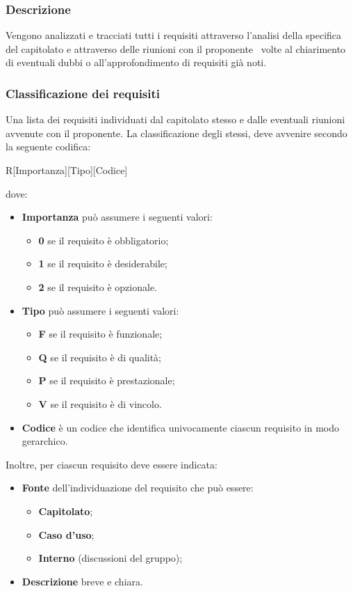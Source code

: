 \documentclass[../NormeDiProgetto.tex]{subfiles}
\begin{document}
			\subsubsection{Descrizione}
				Vengono analizzati e tracciati tutti i requisiti  attraverso l'analisi della specifica del capitolato e attraverso delle riunioni con il proponente \proponente\ volte al chiarimento di eventuali dubbi o all'approfondimento di requisiti già noti.
			\subsubsection{Classificazione dei requisiti}
				Una lista dei requisiti individuati dal capitolato stesso e dalle
				eventuali riunioni avvenute con il proponente. La classificazione
				degli stessi, deve avvenire secondo la seguente codifica:
				\begin{center}
					R[Importanza][Tipo][Codice]
				\end{center}
				dove:
				\begin{itemize}
					\item \textbf{Importanza} può assumere i seguenti valori:
					\begin{itemize}
						\item \textbf{0} se il requisito è obbligatorio;
						\item \textbf{1} se il requisito è desiderabile;
						\item \textbf{2} se il requisito è opzionale.
					\end{itemize}
					\item \textbf{Tipo} può assumere i seguenti valori:
					\begin{itemize}
						\item \textbf{F} se il requisito è funzionale;
						\item \textbf{Q} se il requisito è di qualità;
						\item \textbf{P} se il requisito è prestazionale;
						\item \textbf{V} se il requisito è di vincolo.
					\end{itemize}
					\item \textbf{Codice} è un codice che identifica univocamente
					ciascun requisito in modo gerarchico.
				\end{itemize}
				Inoltre, per ciascun requisito deve essere indicata:
				\begin{itemize}
					\item \textbf{Fonte} dell'individuazione del requisito che può essere:
					\begin{itemize}
						\item \textbf{Capitolato};
						\item \textbf{Caso d'uso};
						\item \textbf{Interno} (discussioni del gruppo);
					\end{itemize}
					\item \textbf{Descrizione} breve e chiara.
				\end{itemize}
\end{document}
